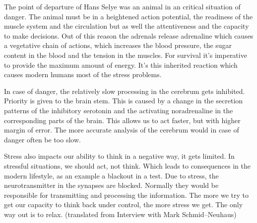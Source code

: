 \documentclass[../main.tex]{subfiles}
\begin{document}
The point of departure of Hans Selye was an animal in an critical situation of danger. The animal must be in a heightened action potential, the readiness of the muscle system and the circulation but as well the attentiveness and the capacity to make decisions. Out of this reason the adrenals release adrenaline which causes a vegetative chain of actions, which increases the blood pressure, the sugar content in the blood and the tension in the muscles. For survival it's imperative to provide the maximum amount of energy. It's this inherited reaction which causes modern humans most of the stress problems.

In case of danger, the relatively slow processing in the cerebrum gets inhibited. Priority is given to the brain stem. This is caused by a change in the secretion patterns of the inhibitory serotonin and the activating noradrenaline in the corresponding parts of the brain. This allows us to act faster, but with higher margin of error. The more accurate analysis of the cerebrum would in case of danger often be too slow.

Stress also impacts our ability to think in a negative way, it gets limited. In stressful situations, we should act, not think. Which leads to consequences in the modern lifestyle, as an example a blackout in a test. Due to stress, the neurotransmitter in the synapses are blocked. Normally they would be responsible for transmitting and processing the information. The more we try to get our capacity to think back under control, the more stress we get. The only way out is to relax. (translated from Interview with Mark Schmid--Neuhaus)
\end{document}
